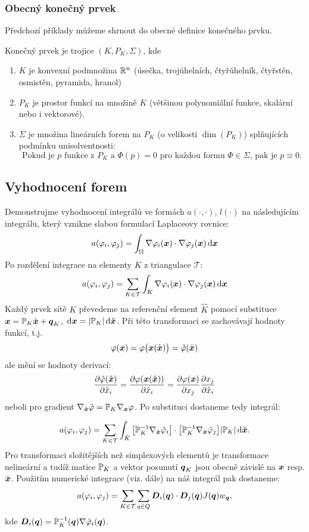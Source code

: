 \subsubsection{Obecný konečný prvek}
Předchozí příklady můžeme shrnout do obecné definice konečného prvku.
\begin{df}
Konečný prvek je trojice $(K, P_K, \Sigma)$, kde
\begin{enumerate}
 \item $K$ je konvexní podmnožina ${\mathbb R}^n$ (úsečka, trojúhelních, čtyřúhelník, čtyřstěn, osmistěn, pyramida, hranol)
 \item $P_K$ je prostor funkcí na množině $K$ (většinou polynomiální funkce, skalární nebo i vektorové). 
 \item $\Sigma$ je množina lineárních forem na $P_K$ (o velikosti $\dim(P_K)$) splňujících podmínku unisolventnosti:
 \[
    \text{Pokud je $p$ funkce z $P_K$ a $\Phi( p )=0$ pro každou formu $\Phi\in\Sigma$, pak je $p\equiv0$.}
 \]
\end{enumerate}
\end{df}


\subsection{Vyhodnocení forem}
Demonstrujme vyhodnocení integrálů ve formách $a(\cdot, \cdot)$, $l(\cdot)$ na následujícím integrálu, který vznikne slabou formulací Laplaceovy rovnice:
\[
 a(\varphi_i, \varphi_j) = \int_\Omega \nabla \varphi_i(\mathbf{\boldsymbol{x}}) \cdot \nabla \varphi_j(\mathbf{\boldsymbol{x}}) \,{\rm d} \mathbf{\boldsymbol{x}}
\]
Po rozdělení integrace na elementy $K$ z triangulace $\mathcal T$:
\[
 a(\varphi_i, \varphi_j) =\sum_{K\in \mathcal T} \int_K  \nabla \varphi_i(\mathbf{\boldsymbol{x}}) \cdot \nabla \varphi_j(\mathbf{\boldsymbol{x}}) \,{\rm d} \mathbf{\boldsymbol{x}} 
\]
Každý prvek sítě $K$ převedeme na referenční element $\hat K$ pomocí substituce 
${\mathbf{\boldsymbol{x}}} = {\mathbb{P}}_K \hat{\mathbf{\boldsymbol{x}}} + \mathbf{\boldsymbol{q}}_K$, $\,{\rm d} \mathbf{\boldsymbol{x}} = \lvert{\mathbb{P}}_K\rvert \,{\rm d} \hat{ \mathbf{\boldsymbol{x}}}$. 
Při této transformaci se zachovávají hodnoty funkcí, t.j. 
\[
    \varphi(\mathbf{\boldsymbol{x}}) = \varphi\big( \mathbf{\boldsymbol{x}}(\hat{\mathbf{\boldsymbol{x}}}) \big)=\hat {\varphi}(\hat{\mathbf{\boldsymbol{x}}}) 
\]
ale mění se hodnoty derivací:
\[
   \frac{\partial \hat{\varphi}(\hat{\mathbf{\boldsymbol{x}}}) }{\partial \hat{x}_i} = \frac{\partial \varphi(\mathbf{\boldsymbol{x}}(\hat{\mathbf{\boldsymbol{x}}})) }{\partial \hat{x}_i} = \frac{\partial \varphi(\mathbf{\boldsymbol{x}})}{\partial x_j}\frac{\partial x_j}{\partial \hat x_i}
\]
neboli pro gradient $\nabla_{\hat{\mathbf{\boldsymbol{x}}}} \hat {\varphi} = {\mathbb{P}}_K \nabla_{\mathbf{\boldsymbol{x}}} \varphi$. Po substituci dostaneme tedy integrál:

\[
  a(\varphi_i, \varphi_j) = \sum_{K\in \mathcal T} \int_{\hat K} 
        \big[ {\mathbb{P}}_K^{-1} \nabla_{\hat{\mathbf{\boldsymbol{x}}}} \hat{\varphi}_i \big] \cdot \big[ {\mathbb{P}}_K^{-1} \nabla_{\hat{ \mathbf{\boldsymbol{x}}}} {\hat {\varphi}}_j \big] \lvert{\mathbb{P}}_K\rvert \,{\rm d} \hat{\mathbf{\boldsymbol{x}}}.
\]
Pro transformaci složitějších než simplexových 
elementů je transformace nelineární a tudíž matice ${\mathbb{P}}_K$ a vektor posunutí $\mathbf{\boldsymbol{q}}_K$ jsou obecně závislé na $\mathbf{\boldsymbol{x}}$ resp. $\hat{\mathbf{\boldsymbol{x}}}$.
Použitím numerické integrace (viz. dále) na náš integrál pak dostaneme:
\[
 a(\varphi_i, \varphi_j) = \sum_{K\in \mathcal T} \sum_{q\in Q} \mathbf{\boldsymbol{D}}_i(\mathbf{\boldsymbol{q}}) \cdot  \mathbf{\boldsymbol{D}}_j(\mathbf{\boldsymbol{q}}) J(\mathbf{\boldsymbol{q}})w_{\mathbf{\boldsymbol{q}}},
\]                   
kde $\mathbf{\boldsymbol{D}}_i(\mathbf{\boldsymbol{q}}) = {\mathbb{P}}_K^{-1}(\mathbf{\boldsymbol{q}}) \nabla \hat {\varphi}_i(\mathbf{\boldsymbol{q}})$.

